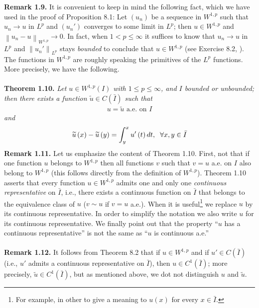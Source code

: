 \documentclass[a4paper,oneside]{article}
\numberwithin{equation}{section}
\begin{document}
\textbf{Remark 1.9.} It is convenient to keep in mind the following fact, which we have used in the proof of Proposition 8.1: Let $\left(u_n\right)$ be a sequence in $W^{1,p}$ such that $u_n\to u$ in $L^p$ and $\left(u_n'\right)$ converges to some limit in $L^p$; then $u \in W^{1,p}$ and ${\left\| {{u_n} - u} \right\|_{{W^{1,p}}}} \to 0$. In fact, when $1<p\le \infty$ it suffices to know that $u_n\to u$ in $L^p$ and ${\left\| {{u_n}'} \right\|_{{L^p}}}$ stays \textit{bounded} to conclude that $u\in W^{1,p}$ (see Exercise 8.2, \cite{1}).\\

The functions in $W^{1,p}$ are roughly speaking the primitives of the $L^p$ functions. More precisely, we have the following.\\
\\
\textbf{Theorem 1.10.} \textit{Let $u\in W^{1,p}\left(I\right)$ with $1\le p\le \infty$, and $I$ bounded or unbounded; then there exists a function $\widetilde{u} \in C\left(\bar{I}\right)$ such that}
\begin{align}
u=\widetilde{u} \mbox{ a.e. on }I
\end{align}
\textit{and}
\begin{align}
\widetilde u\left( x \right) - \widetilde u\left( y \right) = \int_y^x {u'\left( t \right)dt} ,\hspace{0.2cm}\forall x,y \in \bar I 
\end{align}
\textbf{Remark 1.11.} Let us emphasize the content of Theorem 1.10. First, not that if one function $u$ belongs to $W^{1,p}$ then all functions $v$ such that $v=u$ a.e. on $I$ also belong to $W^{1,p}$ (this follows directly from the definition of $W^{1,p}$). Theorem 1.10 asserts that every function $u \in W^{1,p}$ admits one and only one \textit{continuous representative} on $\bar{I}$, i.e., there exists a continuous function on $\bar{I}$ that belongs to the equivalence class of $u$ ($v \sim u$ if $v=u$ a.e.). When it is useful\footnote{For example, in other to give a meaning to $u\left(x\right)$ for every $x\in \bar{I}$.} we replace $u$ by its continuous representative. In order to simplify the notation we also write $u$ for its continuous representative. We finally point out that the property ``$u$ has a continuous representative'' is not the same as ``$u$ is continuous a.e.''\\
\\
\textbf{Remark 1.12.} It follows from Theorem 8.2 that if $u\in W^{1,p}$ and if $u'\in C\left(\bar{I}\right)$ (i.e., $u'$ admits a continuous representative on $\bar{I}$), then $u\in C^1\left(\bar{I}\right)$; more precisely, $\widetilde{u} \in C^1\left(\bar{I}\right)$, but as mentioned above, we dot not distinguish $u$ and $\widetilde{u}$.\\
\end{document}
